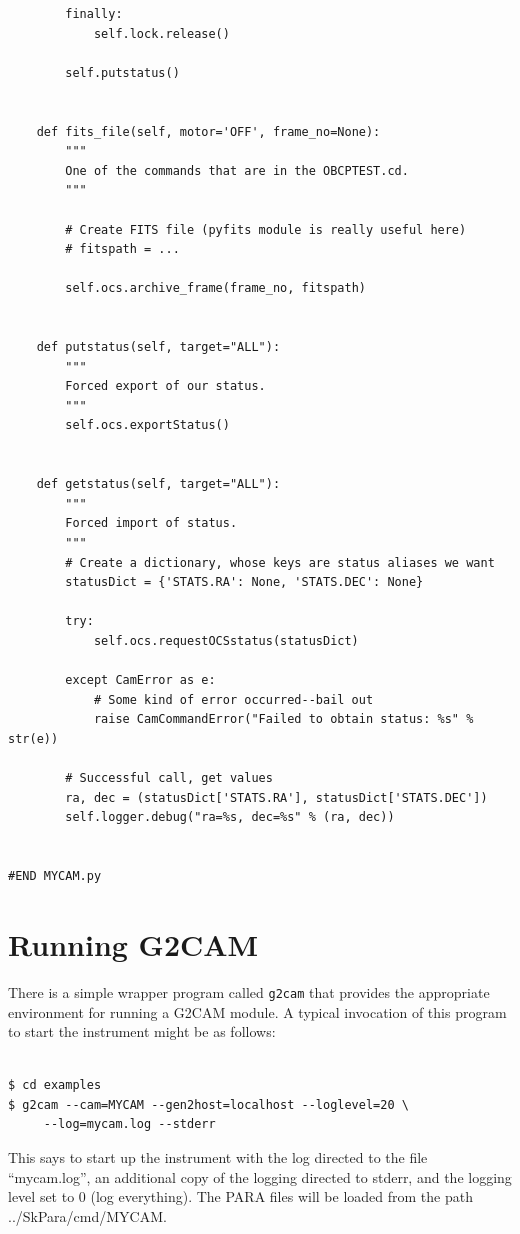 \documentclass[11pt]{report}
\begin{document}
\begin{verbatim}
        finally:
            self.lock.release()

        self.putstatus()


    def fits_file(self, motor='OFF', frame_no=None):
        """
        One of the commands that are in the OBCPTEST.cd.
        """

        # Create FITS file (pyfits module is really useful here)
        # fitspath = ...

        self.ocs.archive_frame(frame_no, fitspath)


    def putstatus(self, target="ALL"):
        """
        Forced export of our status.
        """
        self.ocs.exportStatus()


    def getstatus(self, target="ALL"):
        """
        Forced import of status.
        """
        # Create a dictionary, whose keys are status aliases we want
        statusDict = {'STATS.RA': None, 'STATS.DEC': None}

        try:
            self.ocs.requestOCSstatus(statusDict)

        except CamError as e:
            # Some kind of error occurred--bail out
            raise CamCommandError("Failed to obtain status: %s" % str(e))

        # Successful call, get values
        ra, dec = (statusDict['STATS.RA'], statusDict['STATS.DEC'])
        self.logger.debug("ra=%s, dec=%s" % (ra, dec))


#END MYCAM.py
\end{verbatim}

\chapter{Running G2CAM}
\label{ch:running}
There is a simple wrapper program called {\tt g2cam} that provides the
appropriate environment for running a G2CAM module. A typical invocation
of this program to start the instrument might be as follows: 
\begin{verbatim}

$ cd examples
$ g2cam --cam=MYCAM --gen2host=localhost --loglevel=20 \
     --log=mycam.log --stderr 

\end{verbatim}
This says to start up the instrument with the log directed to the file
``mycam.log'', an additional copy of the logging directed to stderr, and
the logging level set to 0 (log everything). The PARA files will be
loaded from the path ../SkPara/cmd/MYCAM. 
\end{document}
